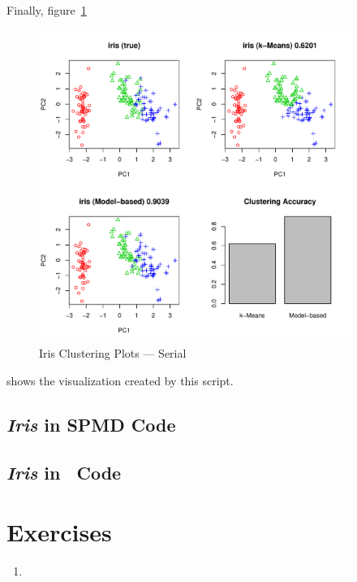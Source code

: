 Finally, figure~\ref{fig:iris_cluster_serial}
\begin{figure}[h!bt]
  \centering
  \includegraphics[width=4in]{pbdDEMO-include/pics/serial_plot.pdf}
  \caption{Iris Clustering Plots --- Serial}
  \label{fig:iris_cluster_serial}
\end{figure}
shows the visualization created by this script.


\subsection{{\it Iris} in SPMD Code}




\subsection{{\it Iris} in \ Code}




\section{Exercises}
\label{sec:pmclust_exercise}

\begin{enumerate}[label=\thechapter-\arabic*]
\item

\end{enumerate}

